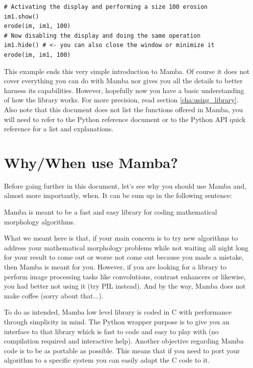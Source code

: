 \documentclass[a4paper,10pt,oneside]{article}
\begin{document}
\lstset{language=Python}
\begin{lstlisting}
# Activating the display and performing a size 100 erosion
im1.show()
erode(im, im1, 100)
# Now disabling the display and doing the same operation
im1.hide() # <- you can also close the window or minimize it
erode(im, im1, 100)
\end{lstlisting}

This example ends this very simple introduction to Mamba. Of course it does not
cover everything you can do with Mamba nor gives you all the details to better
harness its capabilities. However, hopefully now you have a basic understanding 
of how the library works. For more precision, read section \ref{cha:using_library}.
Also note that this document does not list the functions offered in Mamba, you
will need to refer to the Python reference document or to the Python API
quick reference for a list and explanations.

\pagebreak

\section{Why/When use Mamba?}

Before going further in this document, let's see why you should use Mamba and, 
almost more importantly, when. It can be sum up in the following sentence:

Mamba is meant to be a fast and easy library for coding mathematical morphology 
algorithms.

What we meant here is that, if your main concern is to try new algorithms to 
address your mathematical morphology problems while not waiting all night long 
for your result to come out or worse not come out because you made a mistake, 
then Mamba is meant for you. However, if you are looking for a library to perform
image processing tasks like convolutions, contrast enhancers or likewise, you 
had better not using it (try PIL instead). And by the way, Mamba does not make 
coffee (sorry about that...).

To do as intended, Mamba low level library is coded in C with performance through
simplicity in mind. The Python wrapper purpose is to give you an interface to 
that library which is fast to code and easy to play with (no compilation required 
and interactive help). Another objective regarding Mamba code is to be as 
portable as possible. This means that if you need to port your algorithm to a 
specific system you can easily adapt the C code to it.
\end{document}
